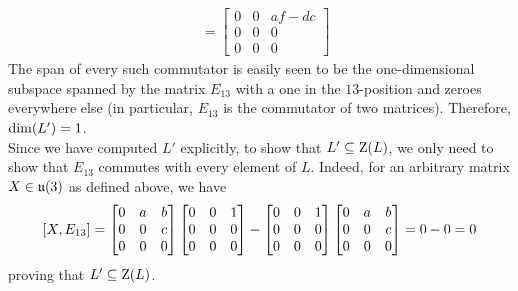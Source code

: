 \begin{boxexample}
\begin{align*}
        &= \begin{bmatrix}
            0 & 0 & af - dc \\
            0 & 0 & 0 \\
            0 & 0 & 0
        \end{bmatrix}
    \end{align*}
    The span of every such commutator is easily seen to be the one-dimensional subspace spanned by the matrix $E_{13}$ with a one in the $13$-position and zeroes everywhere else (in particular, $E_{13}$ is the commutator of two matrices). Therefore, $\dim\!\left( L' \right) = 1$. \\

    Since we have computed $L'$ explicitly, to show that $L' \subseteq \operatorname{Z}\!\left( L \right)$, we only need to show that $E_{13}$ commutes with every element of $L$. Indeed, for an arbitrary matrix $X \in \mathfrak{u}\!\left( 3 \right)$ as defined above, we have
    \begin{align*}
        \left[ X, E_{13} \right] = \begin{bmatrix}
            0 & a & b \\
            0 & 0 & c \\
            0 & 0 & 0
        \end{bmatrix} \begin{bmatrix}
            0 & 0 & 1 \\
            0 & 0 & 0 \\
            0 & 0 & 0
        \end{bmatrix} - \begin{bmatrix}
            0 & 0 & 1 \\
            0 & 0 & 0 \\
            0 & 0 & 0
        \end{bmatrix} \begin{bmatrix}
            0 & a & b \\
            0 & 0 & c \\
            0 & 0 & 0
        \end{bmatrix}
        = 0 - 0 = 0
    \end{align*}
    proving that $L' \subseteq \operatorname{Z}\!\left( L \right)$.
\end{boxexample}



\sorry
